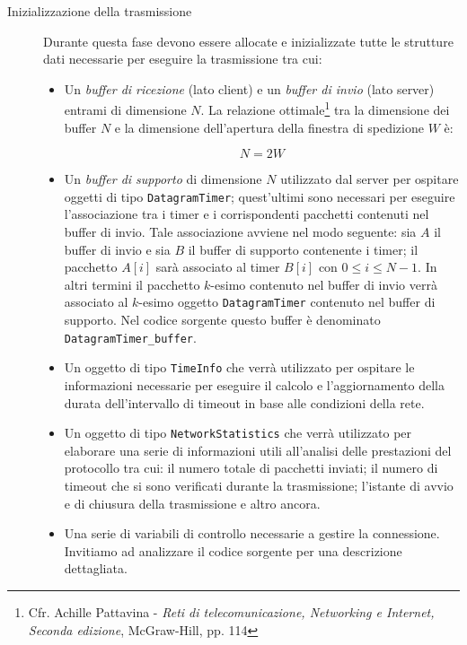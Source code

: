 \documentclass[10pt,a4paper, titlepage]{report}
\begin{document}
\begin{description}
\item[Inizializzazione della trasmissione] Durante questa fase devono essere allocate e inizializzate tutte le strutture dati necessarie per eseguire la trasmissione tra cui:
\begin{itemize}
\item Un \textit{buffer di ricezione} (lato client) e un \textit{buffer di invio} (lato server) entrami di dimensione $N$. La relazione ottimale\footnote{Cfr. Achille Pattavina - \textit{Reti di telecomunicazione, Networking e Internet, Seconda edizione}, McGraw-Hill, pp. 114} tra la dimensione dei buffer $N$ e la dimensione dell'apertura della finestra di spedizione $W$ è:

\begin{equation}
N = 2W
\end{equation}

\item Un \textit{buffer di supporto} di dimensione $N$ utilizzato dal server per ospitare oggetti di tipo \texttt{DatagramTimer}; quest'ultimi sono necessari per eseguire l'associazione tra i timer e i corrispondenti pacchetti contenuti nel buffer di invio. Tale associazione avviene nel modo seguente: sia $A$ il buffer di invio e sia $B$ il buffer di supporto contenente i timer; il pacchetto $A[i]$ sarà associato al timer $B[i]$ con $0 \leq i \leq N - 1$. In altri termini il pacchetto $k$-esimo contenuto nel buffer di invio verrà associato al $k$-esimo oggetto \texttt{DatagramTimer} contenuto nel buffer di supporto. Nel codice sorgente questo buffer è denominato \texttt{DatagramTimer\_buffer}.

\item Un oggetto di tipo \texttt{TimeInfo} che verrà utilizzato per ospitare le informazioni necessarie per eseguire il calcolo e l'aggiornamento della durata dell'intervallo di timeout in base alle condizioni della rete.

\item Un oggetto di tipo \texttt{NetworkStatistics} che verrà utilizzato per elaborare una serie di informazioni utili all'analisi delle prestazioni del protocollo tra cui: il numero totale di pacchetti inviati; il numero di timeout che si sono verificati durante la trasmissione; l'istante di avvio e di chiusura della trasmissione e altro ancora.

\item Una serie di variabili di controllo necessarie a gestire la connessione. Invitiamo ad analizzare il codice sorgente per una descrizione dettagliata.
\end{itemize}


\end{description}
\end{document}
